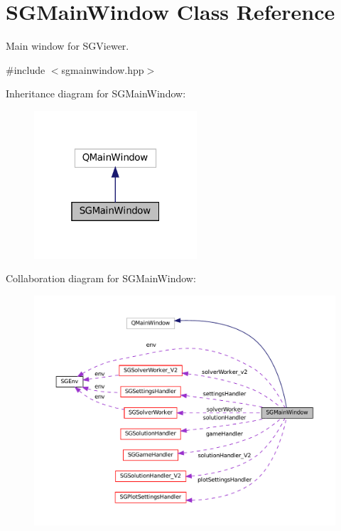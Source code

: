 \hypertarget{classSGMainWindow}{}\section{S\+G\+Main\+Window Class Reference}
\label{classSGMainWindow}


Main window for S\+G\+Viewer.  




{\ttfamily \#include $<$sgmainwindow.\+hpp$>$}



Inheritance diagram for S\+G\+Main\+Window\+:
\nopagebreak
\begin{figure}[H]
\begin{center}
\leavevmode
\includegraphics[width=172pt]{classSGMainWindow__inherit__graph}
\end{center}
\end{figure}


Collaboration diagram for S\+G\+Main\+Window\+:
\nopagebreak
\begin{figure}[H]
\begin{center}
\leavevmode
\includegraphics[width=350pt]{classSGMainWindow__coll__graph}
\end{center}
\end{figure}

